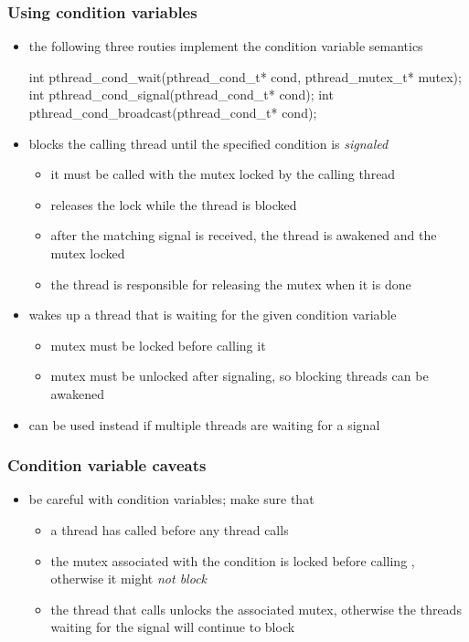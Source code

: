 \begin{frame}[fragile]
%
  \frametitle{Using condition variables}
%
  \begin{itemize}
%
  \item the following three routies implement the condition variable semantics
%
    \begin{C}
int pthread_cond_wait(pthread_cond_t* cond, pthread_mutex_t* mutex);
int pthread_cond_signal(pthread_cond_t* cond);
int pthread_cond_broadcast(pthread_cond_t* cond);
    \end{C}
%
  \item {} blocks the calling thread until the specified
    condition is {\em signaled}
    \begin{itemize}
    \item it must be called with the mutex locked by the calling thread
    \item {} releases the lock while the thread is blocked
    \item after the matching signal is received, the thread is awakened and the mutex locked
    \item the thread is responsible for releasing the mutex when it is done
    \end{itemize}
%
  \item {} wakes up a thread that is waiting for the given
    condition variable
    \begin{itemize}
    \item mutex must be locked before calling it
    \item mutex must be unlocked after signaling, so blocking threads can be awakened
    \end{itemize}
%
  \item {} can be used instead if multiple threads are
    waiting for a signal
%
  \end{itemize}
%
\end{frame}

\begin{frame}[fragile]
%
  \frametitle{Condition variable caveats}
%
  \begin{itemize}
%
  \item be careful with condition variables; make sure that
    \begin{itemize}
    \item a thread has called  before any thread
      calls 
    \item the mutex associated with the condition is locked before calling
      , otherwise it might {\em not block}
    \item the thread that calls  unlocks the associated
      mutex, otherwise the threads waiting for the signal will continue to block
    \end{itemize}
%
%
  \end{itemize}
%
\end{frame}


